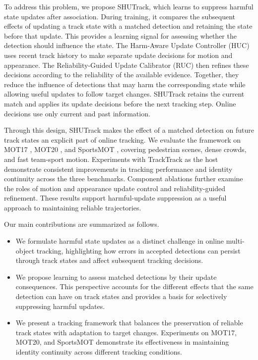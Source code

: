 \documentclass[a4paper,fleqn]{cas-sc}
\begin{document}
To address this problem, we propose SHUTrack, which learns to suppress harmful state updates after association. During training, it compares the subsequent effects of updating a track state with a matched detection and retaining the state before that update. This provides a learning signal for assessing whether the detection should influence the state. The Harm-Aware Update Controller (HUC) uses recent track history to make separate update decisions for motion and appearance. The Reliability-Guided Update Calibrator (RUC) then refines these decisions according to the reliability of the available evidence. Together, they reduce the influence of detections that may harm the corresponding state while allowing useful updates to follow target changes. SHUTrack retains the current match and applies its update decisions before the next tracking step. Online decisions use only current and past information.

Through this design, SHUTrack makes the effect of a matched detection on future track states an explicit part of online tracking. We evaluate the framework on MOT17 \cite{dendorfer2021motchallenge}, MOT20 \cite{dendorfer2020mot20}, and SportsMOT \cite{cui2023sportsmot}, covering pedestrian scenes, dense crowds, and fast team-sport motion. Experiments with TrackTrack as the host demonstrate consistent improvements in tracking performance and identity continuity across the three benchmarks. Component ablations further examine the roles of motion and appearance update control and reliability-guided refinement. These results support harmful-update suppression as a useful approach to maintaining reliable trajectories.

Our main contributions are summarized as follows.
\begin{itemize}
    \item We formulate harmful state updates as a distinct challenge in online multi-object tracking, highlighting how errors in accepted detections can persist through track states and affect subsequent tracking decisions.

    \item We propose learning to assess matched detections by their update consequences. This perspective accounts for the different effects that the same detection can have on track states and provides a basis for selectively suppressing harmful updates.

    \item We present a tracking framework that balances the preservation of reliable track states with adaptation to target changes. Experiments on MOT17, MOT20, and SportsMOT demonstrate its effectiveness in maintaining identity continuity across different tracking conditions.
\end{itemize}
\end{document}
